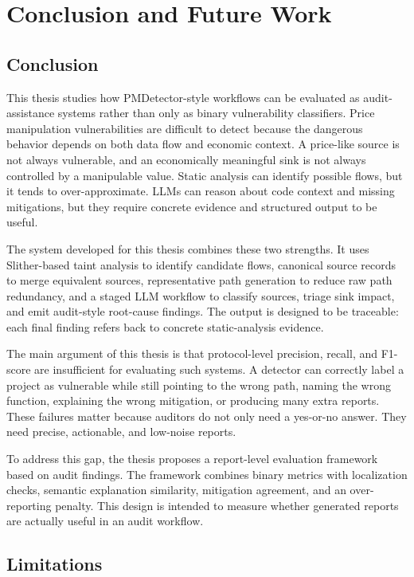 
\chapter{Conclusion and Future Work}

\section{Conclusion}

This thesis studies how PMDetector-style workflows can be evaluated as
audit-assistance systems rather than only as binary vulnerability classifiers.
Price manipulation vulnerabilities are difficult to detect because the
dangerous behavior depends on both data flow and economic context. A price-like
source is not always vulnerable, and an economically meaningful sink is not
always controlled by a manipulable value. Static analysis can identify possible
flows, but it tends to over-approximate. LLMs can reason about code context and
missing mitigations, but they require concrete evidence and structured output
to be useful.

The system developed for this thesis combines these two strengths. It uses
Slither-based taint analysis to identify candidate flows, canonical source
records to merge equivalent sources, representative path generation to reduce
raw path redundancy, and a staged LLM workflow to classify sources, triage sink
impact, and emit audit-style root-cause findings. The output is designed to be
traceable: each final finding refers back to concrete static-analysis evidence.

The main argument of this thesis is that protocol-level precision, recall, and
F1-score are insufficient for evaluating such systems. A detector can correctly
label a project as vulnerable while still pointing to the wrong path, naming
the wrong function, explaining the wrong mitigation, or producing many extra
reports. These failures matter because auditors do not only need a yes-or-no
answer. They need precise, actionable, and low-noise reports.

To address this gap, the thesis proposes a report-level evaluation framework
based on audit findings. The framework combines binary metrics with
localization checks, semantic explanation similarity, mitigation agreement, and
an over-reporting penalty. This design is intended to measure whether generated
reports are actually useful in an audit workflow.

\section{Limitations}

